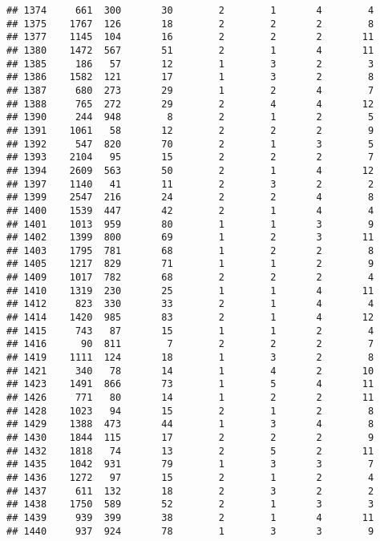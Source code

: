 \documentclass[]{article}
\begin{document}
\begin{verbatim}
## 1374     661  300       30        2        1       4        4
## 1375    1767  126       18        2        2       2        8
## 1377    1145  104       16        2        2       2       11
## 1380    1472  567       51        2        1       4       11
## 1385     186   57       12        1        3       2        3
## 1386    1582  121       17        1        3       2        8
## 1387     680  273       29        1        2       4        7
## 1388     765  272       29        2        4       4       12
## 1390     244  948        8        2        1       2        5
## 1391    1061   58       12        2        2       2        9
## 1392     547  820       70        2        1       3        5
## 1393    2104   95       15        2        2       2        7
## 1394    2609  563       50        2        1       4       12
## 1397    1140   41       11        2        3       2        2
## 1399    2547  216       24        2        2       4        8
## 1400    1539  447       42        2        1       4        4
## 1401    1013  959       80        1        1       3        9
## 1402    1399  800       69        1        2       3       11
## 1403    1795  781       68        1        2       2        8
## 1405    1217  829       71        1        1       2        9
## 1409    1017  782       68        2        2       2        4
## 1410    1319  230       25        1        1       4       11
## 1412     823  330       33        2        1       4        4
## 1414    1420  985       83        2        1       4       12
## 1415     743   87       15        1        1       2        4
## 1416      90  811        7        2        2       2        7
## 1419    1111  124       18        1        3       2        8
## 1421     340   78       14        1        4       2       10
## 1423    1491  866       73        1        5       4       11
## 1426     771   80       14        1        2       2       11
## 1428    1023   94       15        2        1       2        8
## 1429    1388  473       44        1        3       4        8
## 1430    1844  115       17        2        2       2        9
## 1432    1818   74       13        2        5       2       11
## 1435    1042  931       79        1        3       3        7
## 1436    1272   97       15        2        1       2        4
## 1437     611  132       18        2        3       2        2
## 1438    1750  589       52        2        1       3        3
## 1439     939  399       38        2        1       4       11
## 1440     937  924       78        1        3       3        9

\end{verbatim}
\end{document}
